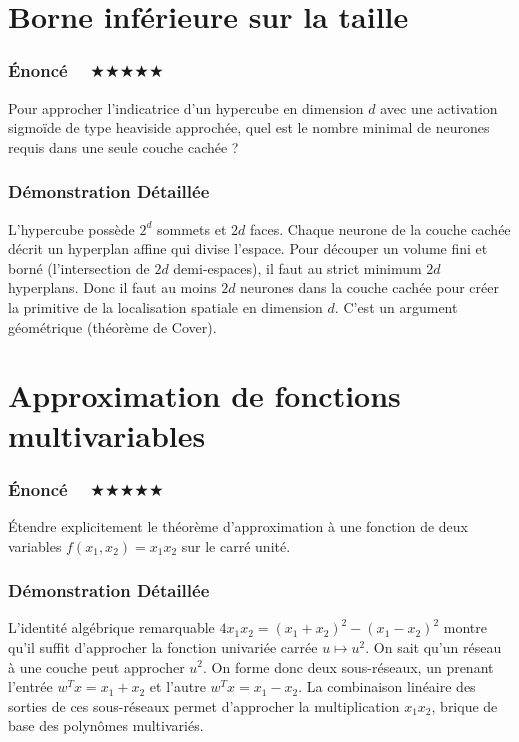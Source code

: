 \documentclass[11pt,a4paper]{article}
\begin{document}
\section{Borne inférieure sur la taille}

\subsubsection{Énoncé $\quad \bigstar\bigstar\bigstar\bigstar\bigstar$}

Pour approcher l'indicatrice d'un hypercube en dimension $d$ avec une activation sigmoïde de type heaviside approchée, quel est le nombre minimal de neurones requis dans une seule couche cachée ?

\subsubsection{Démonstration Détaillée}

L'hypercube possède $2^d$ sommets et $2d$ faces. Chaque neurone de la couche cachée décrit un hyperplan affine qui divise l'espace. Pour découper un volume fini et borné (l'intersection de $2d$ demi-espaces), il faut au strict minimum $2d$ hyperplans. Donc il faut au moins $2d$ neurones dans la couche cachée pour créer la primitive de la localisation spatiale en dimension $d$. C'est un argument géométrique (théorème de Cover).


\section{Approximation de fonctions multivariables}

\subsubsection{Énoncé $\quad \bigstar\bigstar\bigstar\bigstar\bigstar$}

Étendre explicitement le théorème d'approximation à une fonction de deux variables $f(x_1, x_2) = x_1 x_2$ sur le carré unité.

\subsubsection{Démonstration Détaillée}

L'identité algébrique remarquable $4 x_1 x_2 = (x_1 + x_2)^2 - (x_1 - x_2)^2$ montre qu'il suffit d'approcher la fonction univariée carrée $u \mapsto u^2$. On sait qu'un réseau à une couche peut approcher $u^2$. On forme donc deux sous-réseaux, un prenant l'entrée $w^T x = x_1 + x_2$ et l'autre $w^T x = x_1 - x_2$. La combinaison linéaire des sorties de ces sous-réseaux permet d'approcher la multiplication $x_1 x_2$, brique de base des polynômes multivariés.
\end{document}
